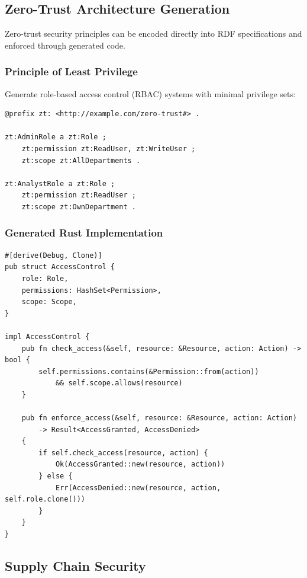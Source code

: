 \subsection{Zero-Trust Architecture Generation}

Zero-trust security principles can be encoded directly into RDF specifications and enforced through generated code.

\subsubsection{Principle of Least Privilege}

Generate role-based access control (RBAC) systems with minimal privilege sets:

\begin{verbatim}
@prefix zt: <http://example.com/zero-trust#> .

zt:AdminRole a zt:Role ;
    zt:permission zt:ReadUser, zt:WriteUser ;
    zt:scope zt:AllDepartments .

zt:AnalystRole a zt:Role ;
    zt:permission zt:ReadUser ;
    zt:scope zt:OwnDepartment .
\end{verbatim}

\subsubsection{Generated Rust Implementation}

\begin{verbatim}
#[derive(Debug, Clone)]
pub struct AccessControl {
    role: Role,
    permissions: HashSet<Permission>,
    scope: Scope,
}

impl AccessControl {
    pub fn check_access(&self, resource: &Resource, action: Action) -> bool {
        self.permissions.contains(&Permission::from(action))
            && self.scope.allows(resource)
    }

    pub fn enforce_access(&self, resource: &Resource, action: Action)
        -> Result<AccessGranted, AccessDenied>
    {
        if self.check_access(resource, action) {
            Ok(AccessGranted::new(resource, action))
        } else {
            Err(AccessDenied::new(resource, action, self.role.clone()))
        }
    }
}
\end{verbatim}

\subsection{Supply Chain Security}

